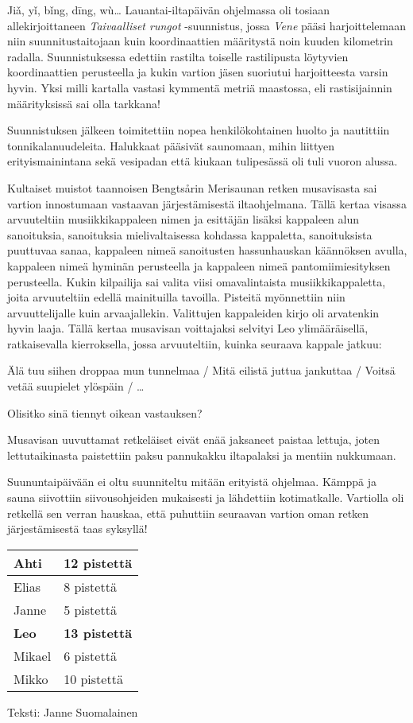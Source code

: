 \begin{multicols}{2}
Jiǎ, yǐ, bǐng, dīng, wù… Lauantai-iltapäivän ohjelmassa oli tosiaan allekirjoittaneen \textit{Taivaalliset rungot} -suunnistus, jossa \textit{Vene} pääsi harjoittelemaan niin suunnitustaitojaan kuin koordinaattien määritystä noin kuuden kilometrin radalla. Suunnistuksessa edettiin rastilta toiselle rastilipusta löytyvien koordinaattien perusteella ja kukin vartion jäsen suoriutui harjoitteesta varsin hyvin. Yksi milli kartalla vastasi kymmentä metriä maastossa, eli rastisijainnin määrityksissä sai olla tarkkana!

Suunnistuksen jälkeen toimitettiin nopea henkilökohtainen huolto ja nautittiin tonnikalanuudeleita. Halukkaat pääsivät saunomaan, mihin liittyen erityismainintana sekä vesipadan että kiukaan tulipesässä oli tuli vuoron alussa.

Kultaiset muistot taannoisen Bengtsårin Merisaunan retken musavisasta sai vartion innostumaan vastaavan järjestämisestä iltaohjelmana. Tällä kertaa visassa arvuuteltiin musiikkikappaleen nimen ja esittäjän lisäksi kappaleen alun sanoituksia, sanoituksia mielivaltaisessa kohdassa kappaletta, sanoituksista puuttuvaa sanaa, kappaleen nimeä sanoitusten hassunhauskan käännöksen avulla, kappaleen nimeä hyminän perusteella ja kappaleen nimeä pantomiimiesityksen perusteella. Kukin kilpailija sai valita viisi omavalintaista musiikkikappaletta, joita arvuuteltiin edellä mainituilla tavoilla. Pisteitä myönnettiin niin arvuuttelijalle kuin arvaajallekin. Valittujen kappaleiden kirjo oli arvatenkin hyvin laaja. Tällä kertaa musavisan voittajaksi selvityi Leo ylimääräisellä, ratkaisevalla kierroksella, jossa arvuuteltiin, kuinka seuraava kappale jatkuu: 

Älä tuu siihen droppaa mun tunnelmaa / Mitä eilistä juttua jankuttaa / Voitsä vetää suupielet ylöspäin / …

Olisitko sinä tiennyt oikean vastauksen?

Musavisan uuvuttamat retkeläiset eivät enää jaksaneet paistaa lettuja, joten lettutaikinasta paistettiin paksu pannukakku iltapalaksi ja mentiin nukkumaan.

Suununtaipäivään ei oltu suunniteltu mitään erityistä ohjelmaa. Kämppä ja sauna siivottiin siivousohjeiden mukaisesti ja lähdettiin kotimatkalle. Vartiolla oli retkellä sen verran hauskaa, että puhuttiin seuraavan vartion oman retken järjestämisestä taas syksyllä!


\begin{center}
\begin{tabular}{ |l|l| }
	\hline
	Ahti & 12 pistettä \\
	\hline
	Elias & 8 pistettä \\
	\hline
	Janne & 5 pistettä \\
	\hline
	\textbf{Leo} & \textbf{13 pistettä} \\
	\hline
	Mikael & 6 pistettä \\
	\hline
	Mikko & 10 pistettä \\
	\hline
\end{tabular}
\end{center}


{\raggedleft Teksti: Janne Suomalainen\par}

\end{multicols}

